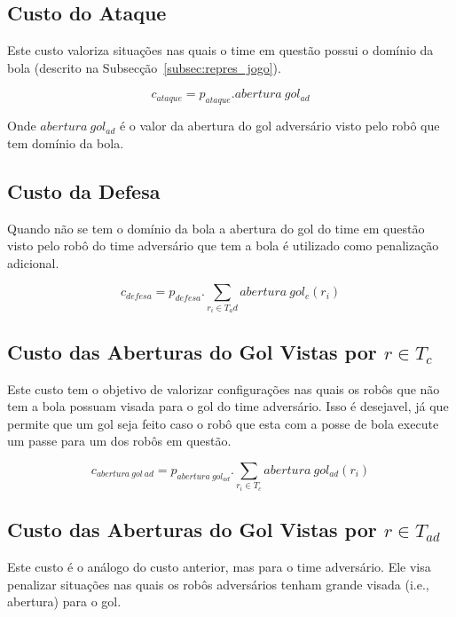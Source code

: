 \subsection{Custo do Ataque}
Este custo valoriza situações nas quais o time em questão
possui o domínio da bola (descrito na Subsecção~\ref{subsec:repres_jogo}).

\begin{dmath} 
 c_{ataque} = p_{ataque} . abertura{\ }gol_{ad}
\end{dmath} 

Onde $abertura{\ }gol_{ad}$ é o valor da abertura do gol adversário visto
pelo robô que tem domínio da bola.

\subsection{Custo da Defesa}
Quando não se tem o domínio da bola a abertura do gol do time em questão
visto pelo robô do time adversário que tem a bola é utilizado
como penalização adicional.

\begin{dmath}
  c_{defesa} = p_{defesa} .
   \sum_{r_i \in T_ad} abertura{\ }gol_c(r_i)
\end{dmath}

\subsection{Custo das Aberturas do Gol Vistas por $r\in T_c$}

Este custo tem o objetivo de valorizar configurações nas quais
os robôs que não tem a bola possuam visada para o gol do time
adversário. Isso
é desejavel, já que permite que um gol seja feito caso o robô
que esta com a posse de bola execute um passe para um dos robôs
em questão.

\begin{dmath}
   c_{abertura{\ }gol{\ }ad} = p_{abertura{\ }gol_{ad}} .
    \sum_{r_i \in T_c} abertura{\ }gol_{ad}(r_i)
\end{dmath}

\subsection{Custo das Aberturas do Gol Vistas por $r\in T_{ad}$}

Este custo é o análogo do custo anterior, mas para o
time adversário. Ele visa penalizar situações nas quais
os robôs adversários tenham grande visada (i.e., abertura)
para o gol. 

